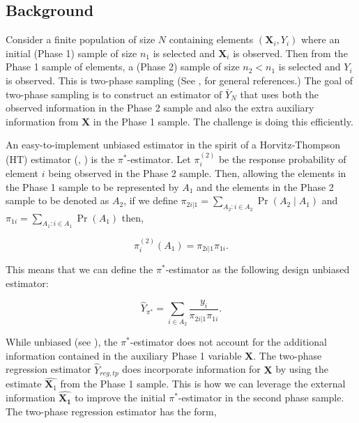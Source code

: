 \documentclass[12pt]{article}
\renewcommand{\bf}[1]{\mathbf{#1}}
\begin{document}
\subsection{Background}

Consider a finite population of size $N$ containing elements $(\bf X_i, Y_i)$ where
an initial (Phase 1) sample of size $n_1$ is selected and $\bf X_i$ is observed. Then
from the Phase 1 sample of elements, a (Phase 2) sample of size $n_2 < n_1$ is
selected and $Y_i$ is observed. This is two-phase sampling (See 
\cite{fuller2009sampling}, \cite{kim2024statistics} for general references.) The
goal of two-phase sampling is to construct an estimator of $\bar Y_N$ 
that uses both the observed information in the Phase 2 sample and also the extra
auxiliary information from $\bf X$ in the Phase 1 sample.
The challenge is doing this efficiently.

An easy-to-implement unbiased estimator in the spirit of a Horvitz-Thompson (HT)
estimator (\cite{horvitz1952generalization}, \cite{narain1951sampling}) is the
$\pi^*$-estimator. Let $\pi_i^{(2)}$ be the response probability of element $i$
being observed in the Phase 2 sample. Then, allowing the elements in the Phase 1
sample to be represented by $A_1$ and the elements in the Phase 2 sample to be
denoted as $A_2$,
if we define $\pi_{2i | 1} = \sum_{A_2: i \in A_2} \Pr(A_2 \mid A_1)$ and
$\pi_{1i} = \sum_{A_1: i \in A_1} \Pr(A_1)$ then,

$$ \pi_i^{(2)}(A_1) = \pi_{2i | 1} \pi_{1i}.$$

This means that we can define the $\pi^*$-estimator as the following design
unbiased estimator:

$$ \hat Y_{\pi^*} = \sum_{i \in A_2} \frac{y_i}{\pi_{2i | 1} \pi_{1i}}.$$

While unbiased (see \cite{kim2024statistics}), the $\pi^*$-estimator does not
account for the additional information contained in the auxiliary Phase 1
variable $\bf X$. The two-phase regression estimator $\hat Y_{reg, tp}$ does
incorporate information for $\bf X$ by using the estimate $\hat{\bf X_1}$ from
the Phase 1 sample. This is how we can leverage the external information 
$\hat{\bf{X_1}}$ to improve the initial $\pi^*$-estimator in the second phase
sample. The two-phase regression estimator has the form,
\end{document}
